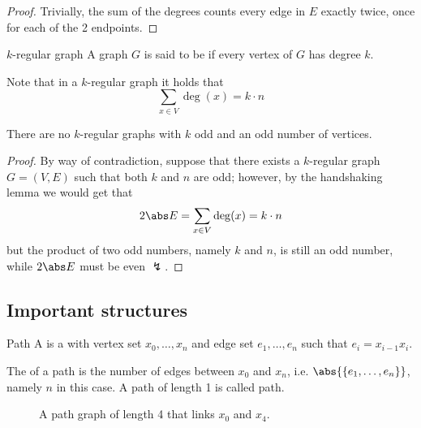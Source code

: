 \documentclass[a4paper, 12pt]{report}
\begin{document}
    \begin{proof}
        Trivially, the sum of the degrees counts every edge in $E$ exactly twice, once for each of the 2 endpoints.
    \end{proof}

    \begin{frameddefn}{$k$-regular graph}
        A graph $G$ is said to be  if every vertex of $G$ has degree $k$.
    \end{frameddefn}

    Note that in a $k$-regular graph it holds that $$\sum_{x \in V}{\deg(x)} = k \cdot n$$

    \begin{framedprop}{}
        There are no $k$-regular graphs with $k$ odd and an odd number of vertices.
    \end{framedprop}
    
    \begin{proof}
        By way of contradiction, suppose that there exists a $k$-regular graph $G = (V, E)$ such that both $k$ and $n$ are odd; however, by the handshaking lemma we would get that $$2 \abs E = \sum_{x \in V} {\deg(x)} = k \cdot n$$ but the product of two odd numbers, namely $k$ and $n$, is still an odd number, while $2 \abs E$ must be even $\lightning$.
    \end{proof}

    \subsection{Important structures}

    \begin{frameddefn}{Path}
        A  is a  with vertex set $x_0, \ldots, x_n$ and edge set $e_1, \ldots, e_n$ such that $e_i = x_{i - 1}x_i$.

        The  of a path is the number of edges between $x_0$ and $x_n$, i.e. $\abs{\{e_1, \ldots, e_n\}}$, namely $n$ in this case. A path of length 1 is called  path.
    \end{frameddefn}

    \begin{figure}[H]
        \centering
        \caption{A path graph of length 4 that links $x_0$ and $x_4$.}
    \end{figure}
\end{document}

